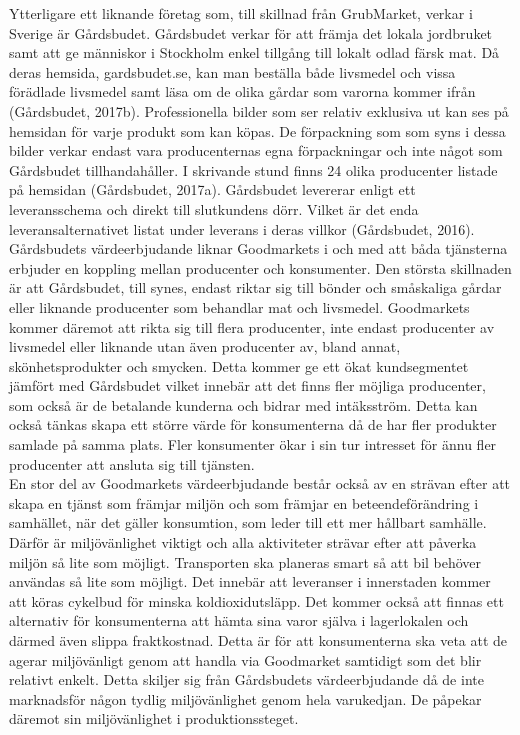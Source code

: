 \documentclass[10pt,a4paper,oneside]{article}
\begin{document}
Ytterligare ett liknande företag som, till skillnad från GrubMarket, verkar i Sverige är Gårdsbudet. Gårdsbudet verkar för att främja det lokala jordbruket samt att ge människor i Stockholm enkel tillgång till lokalt odlad färsk mat. Då deras hemsida, gardsbudet.se, kan man beställa både livsmedel och vissa förädlade livsmedel samt läsa om de olika gårdar som varorna kommer ifrån (Gårdsbudet, 2017b). Professionella bilder som ser relativ exklusiva ut kan ses på hemsidan för varje produkt som kan köpas. De förpackning som som syns i dessa bilder verkar endast vara producenternas egna förpackningar och inte något som Gårdsbudet tillhandahåller. I skrivande stund finns 24 olika producenter listade på hemsidan (Gårdsbudet, 2017a). Gårdsbudet levererar enligt ett leveransschema och direkt till slutkundens dörr. Vilket är det enda leveransalternativet listat under leverans i deras villkor (Gårdsbudet, 2016). Gårdsbudets värdeerbjudande liknar Goodmarkets i och med att båda tjänsterna erbjuder en koppling mellan producenter och konsumenter. Den största skillnaden är att Gårdsbudet, till synes, endast riktar sig till bönder och småskaliga gårdar eller liknande producenter som behandlar mat och livsmedel. Goodmarkets kommer däremot att rikta sig till flera producenter, inte endast producenter av livsmedel eller liknande utan även producenter av, bland annat,  skönhetsprodukter och smycken. Detta kommer ge ett ökat kundsegmentet jämfört med Gårdsbudet vilket innebär att det finns fler möjliga producenter, som också är de betalande kunderna och bidrar med intäksström. Detta kan också tänkas skapa ett större värde för konsumenterna då de har fler produkter samlade på samma plats. Fler konsumenter ökar i sin tur intresset för ännu fler producenter att ansluta sig till tjänsten. \\

En stor del av Goodmarkets värdeerbjudande består också av en strävan efter att skapa en tjänst som främjar miljön och som främjar en beteendeförändring i samhället, när det gäller konsumtion,  som leder till ett mer hållbart samhälle. Därför är miljövänlighet viktigt och alla aktiviteter strävar efter att påverka miljön så lite som möjligt. Transporten ska planeras smart så att bil behöver användas så lite som möjligt. Det innebär att leveranser i innerstaden kommer att köras cykelbud för minska koldioxidutsläpp. Det kommer också att finnas ett alternativ för konsumenterna att hämta sina varor själva i lagerlokalen och därmed även slippa fraktkostnad. Detta är för att konsumenterna ska veta att de agerar miljövänligt genom att handla via Goodmarket samtidigt som det blir relativt enkelt. Detta skiljer sig från Gårdsbudets värdeerbjudande då de inte marknadsför någon tydlig miljövänlighet genom hela varukedjan. De påpekar däremot sin miljövänlighet i produktionssteget. 
\end{document}
